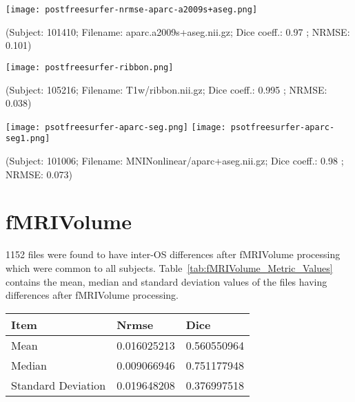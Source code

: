 \hfill \break
\begin{center}
\texttt{[image: postfreesurfer-nrmse-aparc-a2009s+aseg.png]}
\caption*{(Subject: 101410; Filename: aparc.a2009s+aseg.nii.gz; Dice coeff.: 0.97 ; NRMSE: 0.101)}
\label{fig:postfreesurfer_high_nrmse}
\end{center}

\hfill \break
\begin{center}
\texttt{[image: postfreesurfer-ribbon.png]}
\caption*{(Subject: 105216; Filename: T1w/ribbon.nii.gz; Dice coeff.: 0.995 ; NRMSE: 0.038)}
\label{fig:postfreesurfer_ribbon_file}
\end{center}

\hfill \break
\begin{center}
\texttt{[image: psotfreesurfer-aparc-seg.png]}%
\texttt{[image: psotfreesurfer-aparc-seg1.png]}
\caption*{(Subject: 101006; Filename: MNINonlinear/aparc+aseg.nii.gz; Dice coeff.: 0.98 ; NRMSE: 0.073)}
\label{fig:postfreesurfer_ribbon_file}
\end{center}

\section{fMRIVolume}\label{sec:fMRI}
1152 files were found to have inter-OS differences after fMRIVolume processing which were common to all subjects. Table~\ref{tab:fMRIVolume_Metric_Values} contains the mean, median and standard deviation values of the files having differences after fMRIVolume processing.
\hfill \break
\begin{center}
\begin{tabular}{|l|l|l|}
\hline
\textbf{Item}      & \textbf{Nrmse}  & \textbf{Dice} \\ \hline
Mean               & 0.016025213     & 0.560550964   \\ \hline
Median             & 0.009066946     & 0.751177948   \\ \hline
Standard Deviation & 0.019648208     & 0.376997518   \\ \hline
\end{tabular}
\label{tab:fMRIVolume_Metric_Values}
\end{center}
\hfill \break

